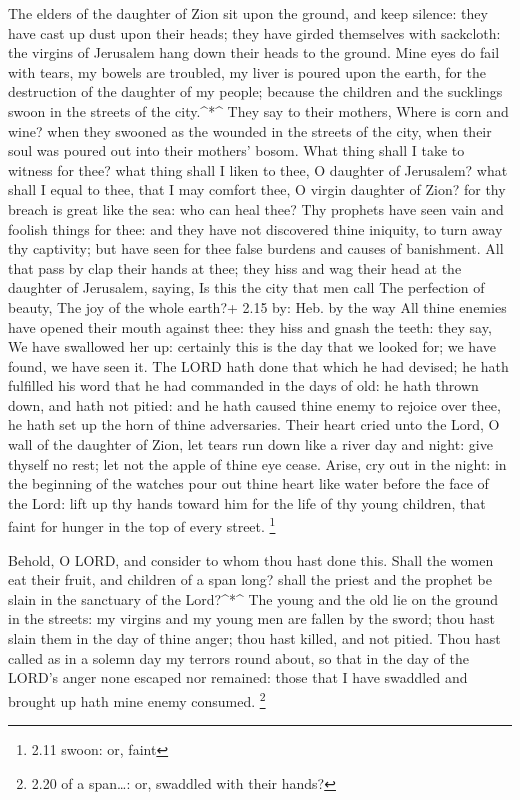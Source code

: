  The elders of the daughter of Zion sit upon the ground,
and keep silence: they have cast up dust upon their heads; they have
girded themselves with sackcloth: the virgins of Jerusalem hang down
their heads to the ground.  Mine eyes do fail with tears,
my bowels are troubled, my liver is poured upon the earth, for the
destruction of the daughter of my people; because the children and the
sucklings swoon in the streets of the city.\^{}*\^{}  They
say to their mothers, Where is corn and wine? when they swooned as the
wounded in the streets of the city, when their soul was poured out into
their mothers' bosom.  What thing shall I take to witness
for thee? what thing shall I liken to thee, O daughter of Jerusalem?
what shall I equal to thee, that I may comfort thee, O virgin daughter
of Zion? for thy breach is great like the sea: who can heal thee?
 Thy prophets have seen vain and foolish things for thee:
and they have not discovered thine iniquity, to turn away thy captivity;
but have seen for thee false burdens and causes of banishment.
 All that pass by clap their hands at thee; they hiss and
wag their head at the daughter of Jerusalem, saying, Is this the city
that men call The perfection of beauty, The joy of the whole earth?+
2.15 by: Heb. by the way  All thine enemies have opened
their mouth against thee: they hiss and gnash the teeth: they say, We
have swallowed her up: certainly this is the day that we looked for; we
have found, we have seen it.  The LORD hath done that which
he had devised; he hath fulfilled his word that he had commanded in the
days of old: he hath thrown down, and hath not pitied: and he hath
caused thine enemy to rejoice over thee, he hath set up the horn of
thine adversaries.  Their heart cried unto the Lord, O wall
of the daughter of Zion, let tears run down like a river day and night:
give thyself no rest; let not the apple of thine eye cease.
 Arise, cry out in the night: in the beginning of the
watches pour out thine heart like water before the face of the Lord:
lift up thy hands toward him for the life of thy young children, that
faint for hunger in the top of every street. \footnote{2.11 swoon: or,
  faint}

 Behold, O LORD, and consider to whom thou hast done this.
Shall the women eat their fruit, and children of a span long? shall the
priest and the prophet be slain in the sanctuary of the Lord?\^{}*\^{}
 The young and the old lie on the ground in the streets: my
virgins and my young men are fallen by the sword; thou hast slain them
in the day of thine anger; thou hast killed, and not pitied.
 Thou hast called as in a solemn day my terrors round
about, so that in the day of the LORD's anger none escaped nor remained:
those that I have swaddled and brought up hath mine enemy consumed.
\footnote{2.20 of a span\ldots: or, swaddled with their hands?}


